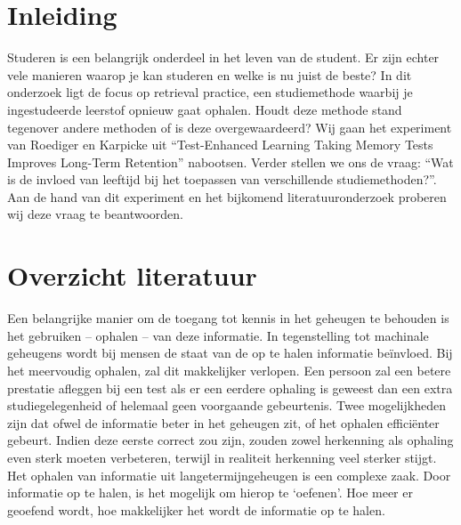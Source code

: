 \documentclass{hogent-article}
\affiliation{
  \textsuperscript{1} \href{mailto:jonah.desmet@student.hogent.be}{jonah.desmet@student.hogent.be}}
\affiliation{
  \textsuperscript{2} \href{mailto:nick.lersberg@student.hogent.be}{mailto:nick.lergsberg@student.hogent.be}}
\affiliation{
    \textsuperscript{3} \href{mailto:miriam.plugge@student.hogent.be}{miriam.plugge@student.hogent.be}}
\affiliation{
    \textsuperscript{4} \href{mailto:lowie.scheirlinckx@student.hogent.be}{lowie.scheirlinckx@student.hogent.be}}
\begin{document}
\flushbottom %
\maketitle %
\tableofcontents %
\thispagestyle{empty} %


\section{Inleiding}
Studeren is een belangrijk onderdeel in het leven van de student. Er zijn echter vele manieren waarop je kan studeren en welke is nu juist de beste? In dit onderzoek ligt de focus op retrieval practice, een studiemethode waarbij je ingestudeerde leerstof opnieuw gaat ophalen. Houdt deze methode stand tegenover andere methoden of is deze overgewaardeerd? Wij gaan het experiment van Roediger en Karpicke uit “Test-Enhanced Learning Taking Memory Tests Improves Long-Term Retention” nabootsen. Verder stellen we ons de vraag: “Wat is de invloed van leeftijd bij het toepassen van verschillende studiemethoden?”. Aan de hand van dit experiment en het bijkomend literatuuronderzoek proberen wij deze vraag te beantwoorden.

\section{Overzicht literatuur}

Een belangrijke manier om de toegang tot kennis in het geheugen te behouden is het gebruiken – ophalen – van deze informatie. In tegenstelling tot machinale geheugens wordt bij mensen de staat van de op te halen informatie beïnvloed. Bij het meervoudig ophalen, zal dit makkelijker verlopen. Een persoon zal een betere prestatie afleggen bij een test als er een eerdere ophaling is geweest dan een extra studiegelegenheid of helemaal geen voorgaande gebeurtenis. 
Twee mogelijkheden zijn dat ofwel de informatie beter in het geheugen zit, of het ophalen efficiënter gebeurt. Indien deze eerste correct zou zijn, zouden zowel herkenning als ophaling even sterk moeten verbeteren, terwijl in realiteit herkenning veel sterker stijgt.
Het ophalen van informatie uit langetermijngeheugen is een complexe zaak. Door informatie op te halen, is het mogelijk om hierop te ‘oefenen’. Hoe meer er geoefend wordt, hoe makkelijker het wordt de informatie op te halen.
\cite{Bjork1988} \par
\cite{Pastoetter2014}
\smallskip
\end{document}
